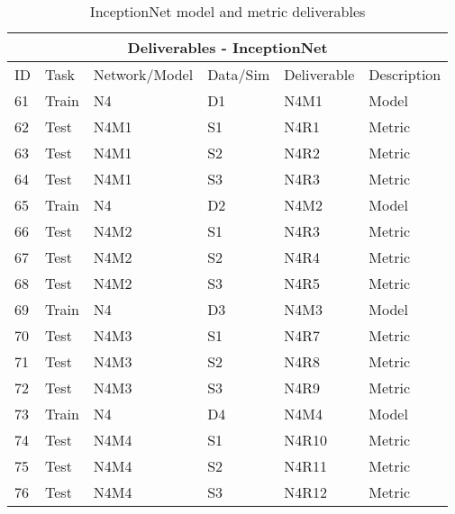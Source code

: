 \begin{table}[]
\begin{center}
\begin{tabular}{|l|l|l|l|l|l|}
\hline
\multicolumn{6}{|c|}{Deliverables - InceptionNet} \\ \hline

ID & Task &  Network/Model & Data/Sim & Deliverable & Description \\ \hline\hline
61 & Train & N4 & D1 & N4M1 & Model \\ \hline
62 & Test & N4M1 & S1 & N4R1 & Metric \\ \hline
63 & Test & N4M1 & S2 & N4R2 & Metric \\ \hline
64 & Test & N4M1 & S3 & N4R3 & Metric \\ \hline\hline

65 & Train & N4 & D2 & N4M2 & Model \\ \hline
66 & Test & N4M2 & S1 & N4R3 & Metric \\ \hline
67 & Test & N4M2 & S2 & N4R4 & Metric \\ \hline
68 & Test & N4M2 & S3 & N4R5 & Metric \\ \hline\hline

69 & Train & N4 & D3 & N4M3 & Model \\ \hline
70 & Test & N4M3 & S1 & N4R7 & Metric \\ \hline
71 & Test & N4M3 & S2 & N4R8 & Metric \\ \hline
72 & Test & N4M3 & S3 & N4R9 & Metric \\ \hline\hline

73 & Train & N4 & D4 & N4M4 & Model \\ \hline
74 & Test & N4M4 & S1 & N4R10 & Metric \\ \hline
75 & Test & N4M4 & S2 & N4R11 & Metric \\ \hline
76 & Test & N4M4 & S3 & N4R12 & Metric \\ \hline 

\end{tabular}
\end{center}
\caption{InceptionNet model and metric deliverables}
\label{Deliverables-InceptionNet}
\end{table}



